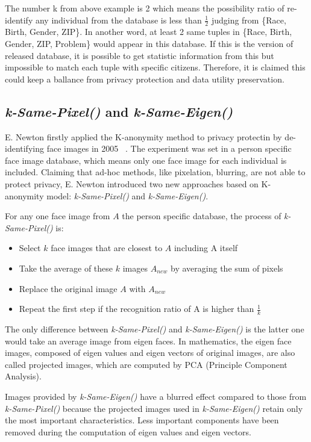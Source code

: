 		The number k from above example is 2 which means the possibility ratio of re-identify any individual from the database is less than $\frac{1}{2}$ judging from \{Race, Birth, Gender, ZIP\}. In another word, at least 2 same tuples in \{Race, Birth, Gender, ZIP, Problem\} would appear in this database. If this is the version of released database, it is possible to get statistic information from this but impossible to match each tuple with specific citizens. Therefore, it is claimed this could keep a ballance from privacy protection and data utility preservation.  
	
	\subsection{\emph{k-Same-Pixel()} and \emph{k-Same-Eigen()}}

	E. Newton firstly applied the K-anonymity method to privacy protectin by de-identifying face images in 2005 ~\cite{Newton05}. The experiment was set in a person specific face image database, which means only one face image for each individual is included. Claiming that ad-hoc methods, like pixelation, blurring, are not able to protect privacy, E. Newton introduced two new approaches based on K-anonymity model: \emph{k-Same-Pixel()} and \emph{k-Same-Eigen()}. 

	For any one face image from $A$ the person specific database, the process of \emph{k-Same-Pixel()} is:
	\begin{itemize}
		\item Select $k$ face images that are closest to $A$ including A itself
		\item Take the average of these $k$ images $A_{new}$ by averaging the sum of pixels
		\item Replace the original image $A$ with $A_{new}$
		\item Repeat the first step if the recognition ratio of A is higher than $\frac{1}{k}$
	\end{itemize}
	The only difference between \emph{k-Same-Pixel()} and \emph{k-Same-Eigen()} is the latter one would take an average image from eigen faces. In mathematics, the eigen face images, composed of eigen values and eigen vectors of original images, are also called projected images, which are computed by PCA (Principle Component Analysis). 

	Images provided by \emph{k-Same-Eigen()} have a blurred effect compared to those from \emph{k-Same-Pixel()} because the projected images used in \emph{k-Same-Eigen()} retain only the most important characteristics. Less important components have been removed during the computation of eigen values and eigen vectors.

